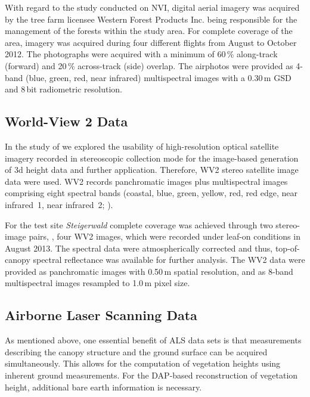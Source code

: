 With regard to the study conducted on \ac{NVI}, digital aerial imagery was acquired by the tree farm licensee
Western Forest Products Inc. being responsible for the management of the forests within the study area.
For complete coverage of the area, imagery was acquired during four different flights from August to October 2012.
The photographs were acquired with a minimum of 60\,\% along-track (forward) and 20\,\% across-track (side) overlap.
The airphotos were provided as 4-band (blue, green, red, near infrared) multispectral images with a 0.30\,m \ac{GSD} and 
8\,bit radiometric resolution.

\subsection{World-View 2 Data}

In the study of \textcite{Immitzer.2016} we explored the usability of high-resolution optical satellite imagery 
recorded in stereoscopic collection mode for the image-based generation of 3d height data and further application. 
Therefore, \ac{WV2} stereo satellite image data were used.
\ac{WV2} records panchromatic images plus multispectral images 
comprising eight spectral bands (coastal, blue, green, yellow,
red, red edge, near infrared~1, near infrared~2; \cite{DigitalGlobe.2013}).
 
For the test site \emph{Steigerwald} complete coverage was achieved through two stereo-image pairs, \ie, four \ac{WV2} images,
which were recorded under leaf-on conditions in August 2013. The spectral data were atmospherically corrected and thus, top-of-canopy
spectral reflectance was available for further analysis. 
The \ac{WV2} data were provided as panchromatic images with 0.50\,m spatial resolution, 
and as 8-band multispectral images resampled to 1.0\,m pixel size.

\subsection{Airborne Laser Scanning Data}

As mentioned above, one essential benefit of \ac{ALS} 
data sets is that measurements describing the canopy structure and the ground surface 
can be acquired simultaneously. This allows for the computation of vegetation heights using inherent ground measurements.
For the \ac{DAP}-based reconstruction of vegetation height, additional bare earth information is necessary. 

